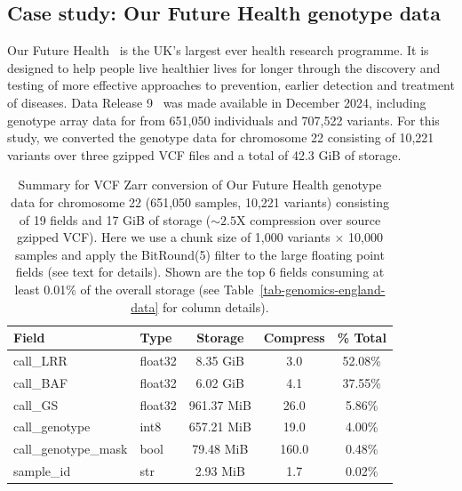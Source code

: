 \documentclass[a4paper,num-refs]{oup-contemporary}
\begin{document}
\subsection{Case study: Our Future Health genotype data}
Our Future Health~\cite{cook2025our,ofhmain_2025}  is the UK’s largest ever health research programme.
It is designed to help people live healthier lives for longer through the
discovery and testing of more effective approaches to prevention, earlier
detection and treatment of diseases.
Data Release 9~\citep{ofhdatarelease9} was made available in December 2024,
including genotype array data for from 651,050 individuals
and 707,522 variants.
For this study, we converted the genotype data for chromosome 22 consisting 
of 10,221 variants over three gzipped VCF files and a total of
42.3 GiB of storage. 

\begin{table}
\caption{Summary for VCF Zarr conversion of 
Our Future Health genotype data for chromosome 22 (651,050 samples, 10,221
variants) consisting of 19 fields and 17 GiB of storage ($\sim2.5$X compression
over source gzipped VCF).
Here we use a chunk size of 1,000 variants $\times$ 10,000 samples and 
apply the BitRound(5) filter to the large floating point fields (see text for 
details). 
Shown are the top 6 fields consuming at least 0.01\% of the overall storage 
(see Table~\ref{tab-genomics-england-data} for column details).
\label{tab-ofh-data}}
\begin{tabular}{llS[table-format=3.2]S[table-format=4.1]S[table-format=3.2]}
\toprule
{Field} & {Type} & {Storage} & {Compress} & {\% Total} \\
\midrule
call\_LRR & float32 & 8.35 GiB & 3.0 & 52.08\% \\
call\_BAF & float32 & 6.02 GiB & 4.1 & 37.55\% \\
call\_GS & float32 & 961.37 MiB & 26.0 & 5.86\% \\
call\_genotype & int8 & 657.21 MiB & 19.0 & 4.00\% \\
call\_genotype\_mask & bool & 79.48 MiB & 160.0 & 0.48\% \\
sample\_id & str & 2.93 MiB & 1.7 & 0.02\% \\
\bottomrule
\end{tabular}
\end{table}
\end{document}
